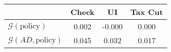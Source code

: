 \begin{tabular}{@{}lccc@{}} 
\toprule 
                          & Check      & UI    & Tax Cut    \\  \midrule 
$\mathcal{G}(\text{policy})$ & 0.002  & -0.000  & 0.000     \\ 
$\mathcal{G}(AD,\text{policy})$ & 0.045  & 0.032  & 0.017     \\ 
\end{tabular}  
